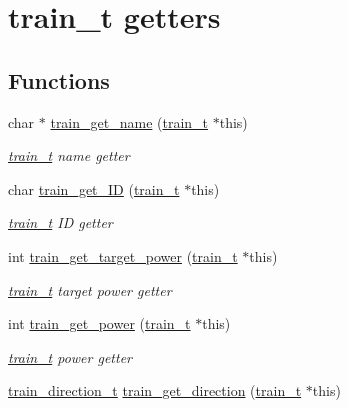 \hypertarget{group__train__t__getters}{\section{train\-\_\-t getters}
\label{group__train__t__getters}
}
\subsection*{Functions}
\begin{DoxyCompactItemize}
\item 
char $\ast$ \hyperlink{group__train__t__getters_ga6128c29e663cec928fc4e85786c6203c}{train\-\_\-get\-\_\-name} (\hyperlink{structtrain__t}{train\-\_\-t} $\ast$this)
\begin{DoxyCompactList}\small\item\em \hyperlink{structtrain__t}{train\-\_\-t} name getter \end{DoxyCompactList}\item 
char \hyperlink{group__train__t__getters_ga5ba83bc59c331387d79aa50aacd567ed}{train\-\_\-get\-\_\-\-I\-D} (\hyperlink{structtrain__t}{train\-\_\-t} $\ast$this)
\begin{DoxyCompactList}\small\item\em \hyperlink{structtrain__t}{train\-\_\-t} I\-D getter \end{DoxyCompactList}\item 
int \hyperlink{group__train__t__getters_gaf37a466896f418f45e1f72541b28a7ee}{train\-\_\-get\-\_\-target\-\_\-power} (\hyperlink{structtrain__t}{train\-\_\-t} $\ast$this)
\begin{DoxyCompactList}\small\item\em \hyperlink{structtrain__t}{train\-\_\-t} target power getter \end{DoxyCompactList}\item 
int \hyperlink{group__train__t__getters_ga8d8b9212e1eea805815a4e9b18ca45df}{train\-\_\-get\-\_\-power} (\hyperlink{structtrain__t}{train\-\_\-t} $\ast$this)
\begin{DoxyCompactList}\small\item\em \hyperlink{structtrain__t}{train\-\_\-t} power getter \end{DoxyCompactList}\item 
\hyperlink{group__train__t__structs_gae1037d4e4a5a1fe1c4bbe139091ef3a2}{train\-\_\-direction\-\_\-t} \hyperlink{group__train__t__getters_ga2a10f8d258424942dc9193d58d846fae}{train\-\_\-get\-\_\-direction} (\hyperlink{structtrain__t}{train\-\_\-t} $\ast$this)

\end{DoxyCompactItemize}
